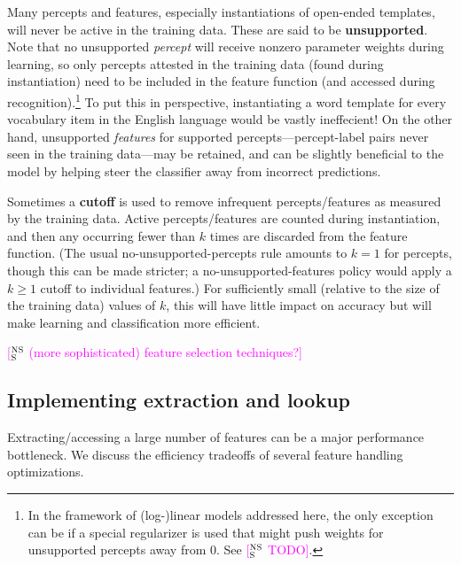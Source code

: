 \documentclass[11pt,letterpaper]{article}
\makeatletter
\newcommand{\ensuretext}[1]{#1}
\newcommand{\nssmarker}{\ensuretext{\textcolor{magenta}{\ensuremath{^{\textsc{NS}}_{\textsc{S}}}}}}
\newcommand{\arkcomment}[3]{\ensuretext{\textcolor{#3}{[#1 #2]}}}
\newcommand{\nss}[1]{\arkcomment{\nssmarker}{#1}{magenta}}
\renewcommand{\paragraph}{%
  \@startsection{paragraph}{4}%
  {\z@}{.2ex \@plus 1ex \@minus .2ex}{-1em}%
  {\normalfont\normalsize\bfseries}%
}
\makeatother
\begin{document}
Many percepts and features, especially instantiations of open-ended templates, will never be active in the training data. 
These are said to be \textbf{unsupported}.
Note that no unsupported {\em percept} will receive nonzero parameter weights during learning, 
so only percepts attested in the training data (found during instantiation) 
need to be included in the feature function (and accessed during recognition).\footnote{In the framework of \mbox{(log-)linear} 
models addressed here, the only exception can be if a special regularizer is used that might push weights for unsupported percepts away from 0. 
See \nss{TODO}.}
To put this in perspective, instantiating a word template for every vocabulary item in the English language would be vastly ineffecient!
On the other hand, unsupported {\em features} for supported percepts---percept-label pairs never seen in the training data---may be retained, 
and can be slightly beneficial to the model by helping steer the classifier away from incorrect predictions. 

Sometimes a \textbf{cutoff} is used to remove infrequent percepts\slash features as measured by the training data.
Active percepts\slash features are counted during instantiation, and then any occurring fewer than $k$ times 
are discarded from the feature function. (The usual no-unsupported-percepts rule amounts to $k=1$ for percepts, 
though this can be made stricter; a no-unsupported-features policy would apply a $k\geq 1$ cutoff to individual features.)
For sufficiently small (relative to the size of the training data) values of $k$, 
this will have little impact on accuracy but will make learning and classification more efficient. 

\nss{(more sophisticated) feature selection techniques?}

\subsection{Implementing extraction and lookup}

Extracting/accessing a large number of features can be a major performance bottleneck. 
We discuss the efficiency tradeoffs of several feature handling optimizations.
\end{document}
